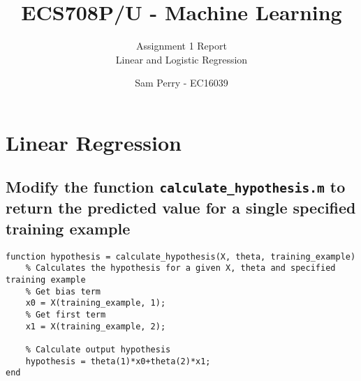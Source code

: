 \documentclass[titlepage]{scrartcl}
\newcommand{\code}[1]{\texttt{#1}}
\begin{document}
\title{ECS708P/U - Machine Learning}
\subtitle{\LARGE{Assignment 1 Report\\Linear and Logistic Regression}}
\author{Sam Perry - EC16039}

\maketitle

\section{Linear Regression}
\subsection{Modify the function \code{calculate\_hypothesis.m} to return the predicted value for a single specified training example}
\begin{lstlisting}
function hypothesis = calculate_hypothesis(X, theta, training_example)
    % Calculates the hypothesis for a given X, theta and specified training example
    % Get bias term
    x0 = X(training_example, 1);
    % Get first term
    x1 = X(training_example, 2);

    % Calculate output hypothesis
    hypothesis = theta(1)*x0+theta(2)*x1;
end
\end{lstlisting}
\end{document}
